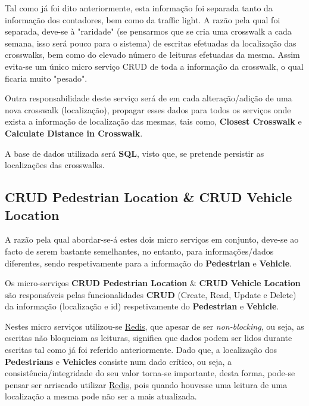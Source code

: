 \documentclass[acmsmall,nonacm,screen]{acmart}
\begin{document}
\hspace{5mm} Tal como já foi dito anteriormente, esta informação foi separada tanto da informação dos contadores, bem como da traffic light. A razão pela qual foi separada, deve-se à "raridade" (se pensarmos que se cria uma crosswalk a cada semana, isso será pouco para o sistema) de escritas efetuadas da localização das crosswalks, bem como do elevado número de leituras efetuadas da mesma. Assim evita-se um único micro serviço CRUD de toda a informação da crosswalk, o qual ficaria muito "pesado".

\hspace{5mm} Outra responsabilidade deste serviço será de em cada alteração/adição de uma nova crosswalk (localização), propagar esses dados para todos os serviços onde exista a informação de localização das mesmas, tais como, \textbf{Closest Crosswalk} e \textbf{Calculate Distance in Crosswalk}.

\hspace{5mm} A base de dados utilizada será \textbf{SQL}, visto que, se pretende persistir as localizações das crosswalks.

\subsection{CRUD Pedestrian Location \& CRUD Vehicle Location}

\hspace{5mm} A razão pela qual abordar-se-á estes dois micro serviços em conjunto, deve-se ao facto de serem bastante semelhantes, no entanto, para informações/dados diferentes, sendo respetivamente para a informação do \textbf{Pedestrian} e \textbf{Vehicle}.

\hspace{5mm} Os micro-serviços \textbf{CRUD Pedestrian Location} \& \textbf{CRUD Vehicle Location} são responsáveis pelas funcionalidades \textbf{CRUD} (Create, Read, Update e Delete) da informação (localização e id) respetivamente do \textbf{Pedestrian} e \textbf{Vehicle}.

\hspace{5mm} Nestes micro serviços utilizou-se \href{https://redis.io/}{Redis}, que apesar de ser \textit{non-blocking}, ou seja, as escritas não bloqueiam as leituras, significa que dados podem ser lidos durante escritas tal como já foi referido anteriormente. Dado que, a localização dos \textbf{Pedestrians} e \textbf{Vehicles} consiste num dado crítico, ou seja, a consistência/integridade do seu valor torna-se importante, desta forma, pode-se pensar ser arriscado utilizar \href{https://redis.io/}{Redis}, pois quando houvesse uma leitura de uma localização a mesma pode não ser a mais atualizada. 
\end{document}
